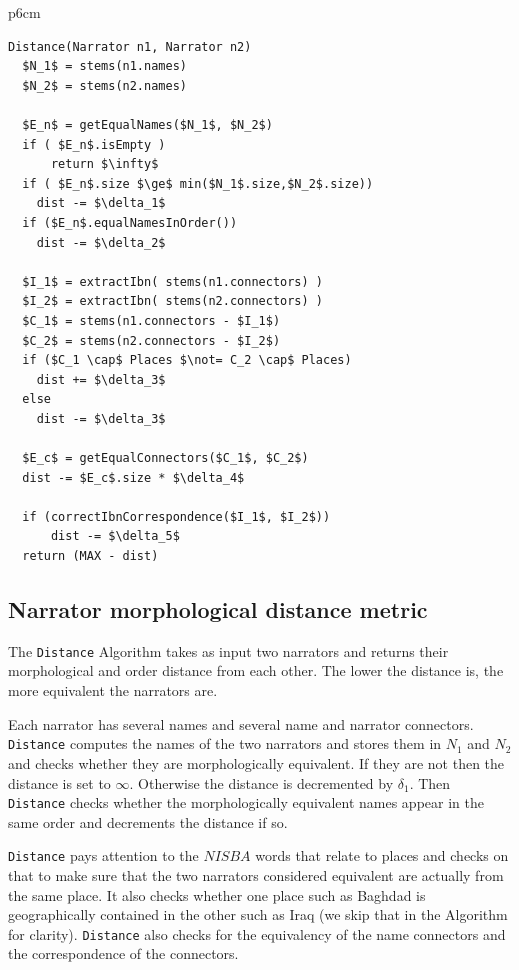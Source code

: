 \documentclass{llncs}
\newcommand{\CodeIn}[1]{{\small\texttt{#1}}}
\begin{document}
\begin{table}[tb]
\begin{tabular} {p{6cm}}
\begin{Verbatim}[fontsize=\relsize{-2},
frame=topline,framesep=4mm,label=\fbox{Narrator distance metric },
commandchars=\\\{\}, codes={\catcode`$=3\catcode`_=8}]
Distance(Narrator n1, Narrator n2)
  $N_1$ = stems(n1.names)
  $N_2$ = stems(n2.names)

  $E_n$ = getEqualNames($N_1$, $N_2$)
  if ( $E_n$.isEmpty ) 
      return $\infty$
  if ( $E_n$.size $\ge$ min($N_1$.size,$N_2$.size))
    dist -= $\delta_1$
  if ($E_n$.equalNamesInOrder())  
    dist -= $\delta_2$

  $I_1$ = extractIbn( stems(n1.connectors) )
  $I_2$ = extractIbn( stems(n2.connectors) )
  $C_1$ = stems(n1.connectors - $I_1$)
  $C_2$ = stems(n2.connectors - $I_2$)
  if ($C_1 \cap$ Places $\not= C_2 \cap$ Places)
    dist += $\delta_3$
  else
    dist -= $\delta_3$

  $E_c$ = getEqualConnectors($C_1$, $C_2$)
  dist -= $E_c$.size * $\delta_4$ 

  if (correctIbnCorrespondence($I_1$, $I_2$))
      dist -= $\delta_5$
  return (MAX - dist)
\end{Verbatim}
\end{tabular}
\end{table}

\subsection{Narrator morphological distance metric}

The \CodeIn{Distance} Algorithm 
takes as input two narrators and returns 
their morphological and order distance
from each other. 
The lower the distance is, the more
equivalent the narrators are. 

Each narrator has several names and several name and 
narrator connectors. 
\CodeIn{Distance} computes the names of the two narrators
and stores them in $N_1$ and $N_2$ 
and checks whether they are morphologically equivalent. 
If they are not then the distance is set to $\infty$. 
Otherwise the distance is decremented by $\delta_1$. 
Then \CodeIn{Distance} checks whether the morphologically 
equivalent names appear in the same order and 
decrements the distance if so. 

\CodeIn{Distance}  pays attention to the $\mathit{NISBA}$ 
words that relate to places and checks on that to make sure
that the two narrators considered equivalent are actually 
from the same place. 
It also checks whether one place such as Baghdad 
is geographically 
contained in the other such as Iraq 
(we skip that in the Algorithm for clarity). 
\CodeIn{Distance} also checks for the equivalency of the
name connectors and the correspondence of the 
connectors. 
                                                         
\end{document}
